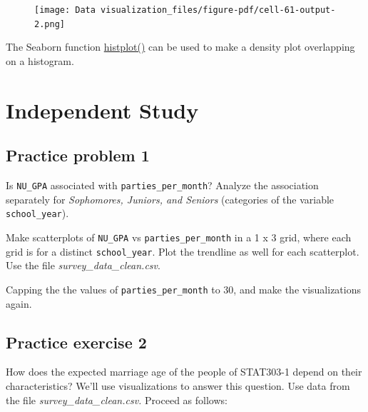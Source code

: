 \documentclass[
  letterpaper,
  DIV=11,
  numbers=noendperiod]{scrreprt}
\begin{document}
\begin{figure}[H]

{\centering \texttt{[image: Data visualization\_files/figure-pdf/cell-61-output-2.png]}

}

\end{figure}

The Seaborn function
\href{https://seaborn.pydata.org/generated/seaborn.histplot.html}{histplot()}
can be used to make a density plot overlapping on a histogram.

\hypertarget{independent-study}{%
\section{Independent Study}\label{independent-study}}

\hypertarget{practice-problem-1}{%
\subsection{Practice problem 1}\label{practice-problem-1}}

Is \texttt{NU\_GPA} associated with \texttt{parties\_per\_month}?
Analyze the association separately for \emph{Sophomores, Juniors, and
Seniors} (categories of the variable \texttt{school\_year}).

Make scatterplots of \texttt{NU\_GPA} vs \texttt{parties\_per\_month} in
a 1 x 3 grid, where each grid is for a distinct \texttt{school\_year}.
Plot the trendline as well for each scatterplot. Use the file
\emph{survey\_data\_clean.csv}.

Capping the the values of \texttt{parties\_per\_month} to 30, and make
the visualizations again.

\hypertarget{practice-exercise-2-3}{%
\subsection{Practice exercise 2}\label{practice-exercise-2-3}}

How does the expected marriage age of the people of STAT303-1 depend on
their characteristics? We'll use visualizations to answer this question.
Use data from the file \emph{survey\_data\_clean.csv.} Proceed as
follows:
\end{document}
